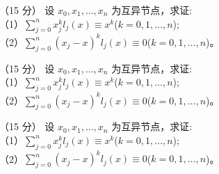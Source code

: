 \documentclass[UTF8]{ctexart}
\newcommand{\dis}{\displaystyle}
\begin{document}
\newpage
\linespread{1.3}\selectfont

\begin{list}{\heiti{}、}
            {\setlength{\topsep}{1mm}
             \setlength{\listparindent}{0pt}
             \setlength{\itemsep}{2em}
             \setlength{\labelsep}{0pt}
             \setcounter{forlist}{1}}

\item （15 分） %
设 $x_0,x_1,\ldots,x_n$ 为互异节点，求证: \\[1ex]
（1）$\dis\sum\limits_{j=0}^n x_j^k l_j(x) \equiv x^k $\quad ($k=0,1,\ldots,n$); \\
（2）$\dis\sum\limits_{j=0}^n (x_j-x)^k l_j(x) \equiv 0$\quad ($k=0,1,\ldots,n$)。

\item （15 分） %
设 $x_0,x_1,\ldots,x_n$ 为互异节点，求证: \\[1ex]
（1）$\dis\sum\limits_{j=0}^n x_j^k l_j(x) \equiv x^k $\quad ($k=0,1,\ldots,n$); \\
（2）$\dis\sum\limits_{j=0}^n (x_j-x)^k l_j(x) \equiv 0$\quad ($k=0,1,\ldots,n$)。

\item （15 分） %
设 $x_0,x_1,\ldots,x_n$ 为互异节点，求证: \\[1ex]
（1）$\dis\sum\limits_{j=0}^n x_j^k l_j(x) \equiv x^k $\quad ($k=0,1,\ldots,n$); \\
（2）$\dis\sum\limits_{j=0}^n (x_j-x)^k l_j(x) \equiv 0$\quad ($k=0,1,\ldots,n$)。


\end{list}
\end{document}
